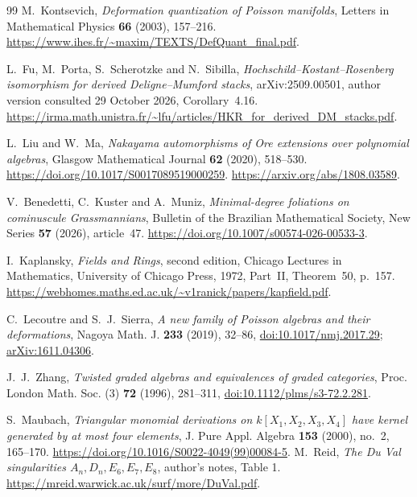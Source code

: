 \begin{thebibliography}{99}
M.~Kontsevich,
\emph{Deformation quantization of Poisson manifolds},
Letters in Mathematical Physics \textbf{66} (2003), 157--216.
\url{https://www.ihes.fr/~maxim/TEXTS/DefQuant_final.pdf}.

L.~Fu, M.~Porta, S.~Scherotzke and N.~Sibilla,
\emph{Hochschild--Kostant--Rosenberg isomorphism for derived Deligne--Mumford stacks},
arXiv:2509.00501, author version consulted 29 October 2026, Corollary~4.16.
\url{https://irma.math.unistra.fr/~lfu/articles/HKR_for_derived_DM_stacks.pdf}.

L.~Liu and W.~Ma,
\emph{Nakayama automorphisms of Ore extensions over polynomial algebras},
Glasgow Mathematical Journal \textbf{62} (2020), 518--530.
\url{https://doi.org/10.1017/S0017089519000259}.
\url{https://arxiv.org/abs/1808.03589}.

V.~Benedetti, C.~Kuster and A.~Muniz,
\emph{Minimal-degree foliations on cominuscule Grassmannians},
Bulletin of the Brazilian Mathematical Society, New Series \textbf{57} (2026), article~47.
\url{https://doi.org/10.1007/s00574-026-00533-3}.

I.~Kaplansky, \emph{Fields and Rings}, second edition,
Chicago Lectures in Mathematics, University of Chicago Press, 1972,
Part~II, Theorem~50, p.~157.
\url{https://webhomes.maths.ed.ac.uk/~v1ranick/papers/kapfield.pdf}.

C.~Lecoutre and S.~J.~Sierra,
\emph{A new family of Poisson algebras and their deformations},
Nagoya Math. J. \textbf{233} (2019), 32--86,
\href{https://doi.org/10.1017/nmj.2017.29}{doi:10.1017/nmj.2017.29};
\href{https://arxiv.org/abs/1611.04306}{arXiv:1611.04306}.

J.~J.~Zhang,
\emph{Twisted graded algebras and equivalences of graded categories},
Proc. London Math. Soc. (3) \textbf{72} (1996), 281--311,
\href{https://doi.org/10.1112/plms/s3-72.2.281}{doi:10.1112/plms/s3-72.2.281}.

S.~Maubach, \emph{Triangular monomial derivations on $k[X_1,X_2,X_3,X_4]$
have kernel generated by at most four elements},
J. Pure Appl. Algebra \textbf{153} (2000), no.~2, 165--170.
\url{https://doi.org/10.1016/S0022-4049(99)00084-5}.
M.~Reid, \emph{The Du Val singularities $A_n,D_n,E_6,E_7,E_8$},
author's notes, Table 1.
\url{https://mreid.warwick.ac.uk/surf/more/DuVal.pdf}.

\end{thebibliography}
